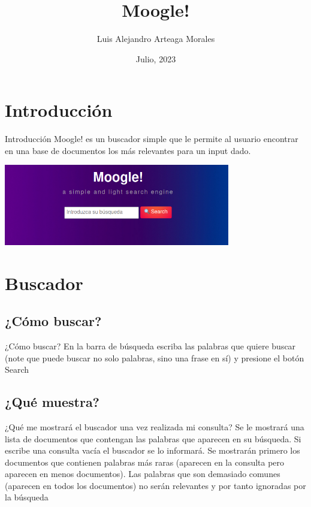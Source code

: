 \documentclass{beamer}
\title{Moogle!}
\institute{Facultad de Matemática y Computación\\Universidad de la Habana}
\author{Luis Alejandro Arteaga Morales}
\date{Julio, 2023}
\begin{document}
\maketitle

\section{Introducción}\label{sec:intro}

\begin{frame}{Introducción}
    Moogle! es un buscador simple que le permite al usuario encontrar en una base de documentos los más relevantes para un input dado.
    \begin{center}        
        \includegraphics[height=100pt]{moogle.png}
    \end{center}
\end{frame}

\section{Buscador}\label{sec:how}

\subsection{¿Cómo buscar?}
\begin{frame}{¿Cómo buscar?}
    En la barra de búsqueda escriba las palabras que quiere buscar (note que puede buscar no solo palabras, sino una frase en sí) y presione el botón Search
\end{frame}

\subsection{¿Qué muestra?}
\begin{frame}{¿Qué me mostrará el buscador una vez realizada mi consulta?}
    Se le mostrará una lista de documentos que contengan las palabras que aparecen en su búsqueda. Si escribe una consulta vacía el buscador se lo informará. Se mostrarán primero los documentos que contienen palabras más raras (aparecen en la consulta pero aparecen en menos documentos). Las palabras que son demasiado comunes (aparecen en todos los documentos) no serán relevantes y por tanto ignoradas por la búsqueda
\end{frame}
\end{document}
